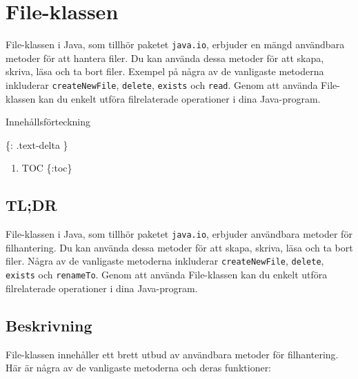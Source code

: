 \hypertarget{file-klassen}{%
\section{File-klassen}\label{file-klassen}}

File-klassen i Java, som tillhör paketet \texttt{java.io}, erbjuder en
mängd användbara metoder för att hantera filer. Du kan använda dessa
metoder för att skapa, skriva, läsa och ta bort filer. Exempel på några
av de vanligaste metoderna inkluderar \texttt{createNewFile},
\texttt{delete}, \texttt{exists} och \texttt{read}. Genom att använda
File-klassen kan du enkelt utföra filrelaterade operationer i dina
Java-program.

Innehållsförteckning

\{: .text-delta \}

\begin{enumerate}
\def\labelenumi{\arabic{enumi}.}
\tightlist
\item
  TOC \{:toc\}
\end{enumerate}

\hypertarget{tldr}{%
\subsection{TL;DR}\label{tldr}}

File-klassen i Java, som tillhör paketet \texttt{java.io}, erbjuder
användbara metoder för filhantering. Du kan använda dessa metoder för
att skapa, skriva, läsa och ta bort filer. Några av de vanligaste
metoderna inkluderar \texttt{createNewFile}, \texttt{delete},
\texttt{exists} och \texttt{renameTo}. Genom att använda File-klassen
kan du enkelt utföra filrelaterade operationer i dina Java-program.

\hypertarget{beskrivning}{%
\subsection{Beskrivning}\label{beskrivning}}

File-klassen innehåller ett brett utbud av användbara metoder för
filhantering. Här är några av de vanligaste metoderna och deras
funktioner:

